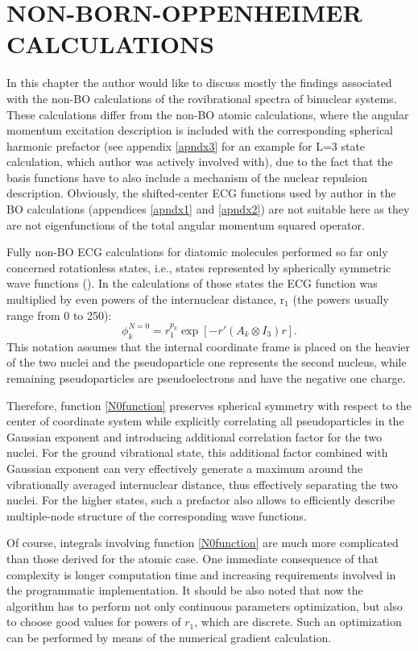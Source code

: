 \chapter{NON-BORN-OPPENHEIMER CALCULATIONS\label{nonBO}}

In this chapter the author would like to discuss mostly the 
findings associated with the non-BO calculations of the rovibrational 
spectra of binuclear systems. These calculations differ from 
the non-BO atomic calculations, where the angular momentum 
excitation description is included with the corresponding 
spherical harmonic prefactor (see appendix \ref{apndx3} for an
example for L=3 state calculation, which author was actively 
involved with), 
due to the fact that the basis functions have to also include
a mechanism of the nuclear repulsion description.
Obviously, the shifted-center ECG functions used by author in
the BO calculations (appendices \ref{apndx1} and \ref{apndx2}) are
not suitable here as they are not eigenfunctions of the total
angular momentum squared operator.

Fully non-BO ECG calculations for diatomic molecules performed 
so far only concerned rotationless states, i.e., states represented 
by spherically symmetric wave functions (\cite{N0_1,N0_2}). 
In the calculations of those states the ECG function was multiplied 
by even powers of the internuclear distance, r$_1$ 
(the powers usually range from 0 to 250):
\begin{equation}
\phi_k^{N=0} = r_1^{p_k} \exp [-r'(A_k \otimes I_3) r].
\label{N0function}
\end{equation}
This notation assumes that the internal coordinate frame is placed on 
the heavier of the two
nuclei and the pseudoparticle one represents the second nucleus, while remaining
pseudoparticles are pseudoelectrons and have the negative one charge.

Therefore, function \ref{N0function} preserves spherical symmetry with respect
to the center of coordinate system while explicitly correlating all pseudoparticles
in the Gaussian exponent and introducing additional correlation factor for
the two nuclei. For the ground vibrational state, this additional factor combined 
with Gaussian exponent can very effectively generate a maximum around the vibrationally
averaged internuclear distance, thus effectively separating the two nuclei.
For the higher states, such a prefactor also allows to efficiently describe multiple-node 
structure of the corresponding wave functions.

Of course, integrals involving function \ref{N0function} are much more complicated 
than those derived for the atomic case. One immediate consequence of that complexity 
is longer computation time and increasing requirements involved in the 
programmatic implementation.
It should be also noted that now the algorithm has to perform not only continuous
parameters optimization, but also to choose good values for powers of $r_1$,
which are discrete. Such an optimization can be performed by means of the numerical 
gradient calculation.

